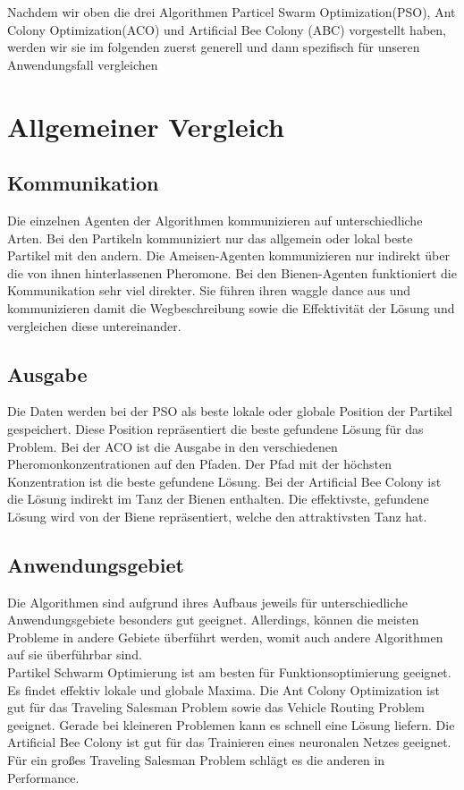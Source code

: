 Nachdem wir oben die drei Algorithmen Particel Swarm Optimization(PSO), Ant Colony Optimization(ACO) und  Artificial Bee Colony (ABC) vorgestellt haben, werden wir sie im folgenden zuerst generell und dann spezifisch für unseren Anwendungsfall vergleichen\\

\section*{Allgemeiner Vergleich}

\subsection*{Kommunikation}
Die einzelnen Agenten der Algorithmen kommunizieren auf unterschiedliche Arten. Bei den Partikeln kommuniziert nur das allgemein oder lokal beste Partikel mit den andern. 
Die Ameisen-Agenten kommunizieren nur indirekt über die von ihnen hinterlassenen Pheromone. Bei den Bienen-Agenten funktioniert die Kommunikation sehr viel direkter.
Sie führen ihren waggle dance aus und kommunizieren damit die Wegbeschreibung sowie die Effektivität der Lösung und vergleichen diese untereinander.

\subsection*{Ausgabe}
Die Daten werden bei der PSO als beste lokale oder globale Position der Partikel gespeichert. Diese Position repräsentiert die beste gefundene Lösung für das Problem.
Bei der ACO ist die Ausgabe in den verschiedenen Pheromonkonzentrationen auf den Pfaden. Der Pfad mit der höchsten Konzentration ist die beste gefundene Lösung.
Bei der Artificial Bee Colony ist die Lösung indirekt im Tanz der Bienen enthalten. Die effektivste, gefundene Lösung wird von der Biene repräsentiert, welche den attraktivsten Tanz hat.

\subsection*{Anwendungsgebiet}
Die Algorithmen sind aufgrund ihres Aufbaus jeweils für unterschiedliche Anwendungsgebiete besonders gut geeignet. Allerdings, können die meisten Probleme in andere Gebiete überführt werden, womit auch andere Algorithmen auf sie überführbar sind.\\
Partikel Schwarm Optimierung ist am besten für Funktionsoptimierung geeignet. Es findet effektiv lokale und globale Maxima.
Die Ant Colony Optimization ist gut für das Traveling Salesman Problem sowie das Vehicle Routing Problem geeignet. Gerade bei kleineren Problemen kann es schnell eine Lösung liefern\cite{sabet2016comparison}.
Die Artificial Bee Colony ist gut für das Trainieren eines neuronalen Netzes geeignet. Für ein großes Traveling Salesman Problem schlägt es die anderen in Performance\cite{sabet2016comparison}.




